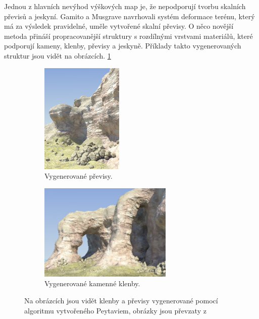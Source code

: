 Jednou z hlavních nevýhod výškových map je, že nepodporují tvorbu skalních převisů a jeskyní. Gamito a Musgrave \cite{Gamito2001ProceduralLW} navrhovali systém deformace terénu, který má za výsledek pravidelné, uměle vytvořené skalní převisy. O něco novější metoda \cite{Peytavie09} přináší propracovanější struktury s rozdílnými vrstvami materiálů, které podporují kameny, klenby, převisy a jeskyně. Příklady takto vygenerovaných struktur jsou vidět na obrázcích. \ref{PeytavieGen}

\begin{figure}[H]
	\centering
	\begin{subfigure}{0.475\textwidth}
		\centering
		\includegraphics[scale=1]{obrazky-figures/Overhang.png}
		\caption{Vygenerované převisy.}
	\end{subfigure}
	\begin{subfigure}{0.475\textwidth}
		\centering
		\includegraphics[scale=1]{obrazky-figures/Arches.png}
		\caption{Vygenerované kamenné klenby.}
	\end{subfigure}
	\caption{Na obrázcích jsou vidět klenby a převisy vygenerované pomocí algoritmu vytvořeného Peytaviem, obrázky jsou převzaty z \cite{Peytavie09}}
	\label{PeytavieGen}
\end{figure}

\iffalse
